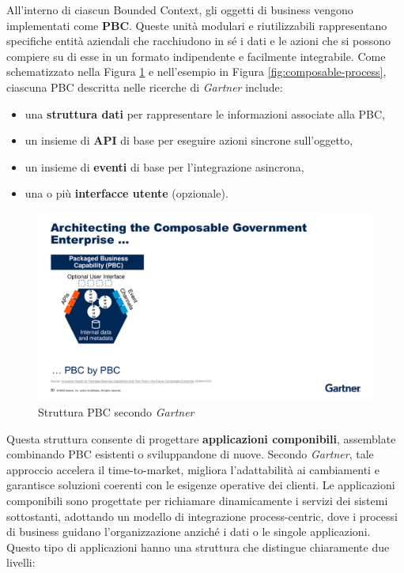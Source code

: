 All’interno di ciascun Bounded Context, gli oggetti di business vengono implementati come \textbf{\ac{PBC}}.
Queste unità modulari e riutilizzabili rappresentano specifiche entità aziendali che racchiudono in sé i dati e le azioni che
si possono compiere su di esse in un formato indipendente e facilmente integrabile. Come schematizzato nella Figura \ref{fig:pbc-struttura}
e nell’esempio in Figura \ref{fig:composable-process}, ciascuna \ac{PBC} descritta nelle ricerche di \textit{Gartner}\cite{natis2019innovation}\cite{burke2020top} include:

\begin{itemize}
    \item una \textbf{struttura dati} per rappresentare le informazioni associate alla \ac{PBC},
    \item un insieme di \textbf{API} di base per eseguire azioni sincrone sull'oggetto,
    \item un insieme di \textbf{eventi} di base per l'integrazione asincrona,
    \item una o più \textbf{interfacce utente} (opzionale).
\end{itemize}

\begin{figure}
    \centering
    \includegraphics[scale=0.6]{figures/PBCstructure.pdf}
    \caption{Struttura \ac{PBC} secondo \textit{Gartner}}
    \label{fig:pbc-struttura}
\end{figure}

Questa struttura consente di progettare \textbf{applicazioni componibili}, assemblate combinando \ac{PBC} esistenti o sviluppandone di nuove.
Secondo \textit{Gartner}, tale approccio accelera il time-to-market, migliora l’adattabilità ai cambiamenti e garantisce soluzioni coerenti
con le esigenze operative dei clienti. Le applicazioni componibili sono progettate per richiamare dinamicamente i servizi dei
sistemi sottostanti, adottando un modello di integrazione process-centric, dove i processi di business guidano l’organizzazione
anziché i dati o le singole applicazioni. Questo tipo di applicazioni hanno una struttura che distingue chiaramente due livelli:

